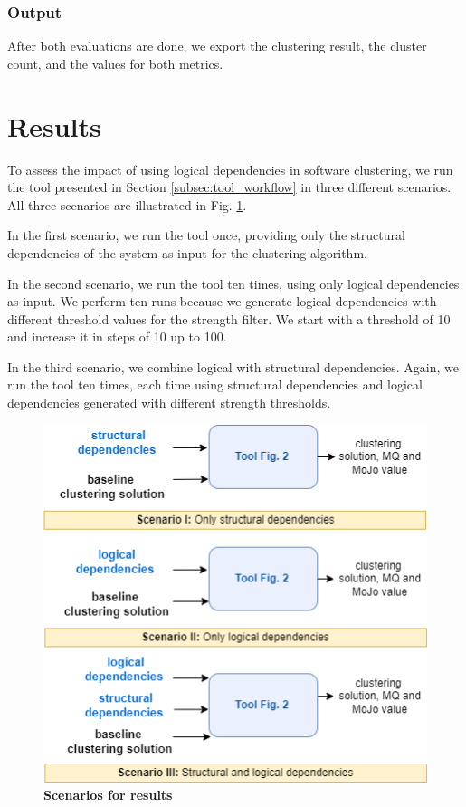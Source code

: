 \documentclass{ieeeaccess}
\begin{document}
\subsubsection{Output}

After both evaluations are done, we export the clustering result, the cluster count, and the values for both metrics.

\section{Results}
\label{sec:results}

To assess the impact of using logical dependencies in software clustering, we run the tool presented in Section \ref{subsec:tool_workflow} in three different scenarios. All three scenarios are illustrated in Fig. \ref{fig:scenatrio}.

In the first scenario, we run the tool once, providing only the structural dependencies of the system as input for the clustering algorithm.

In the second scenario, we run the tool ten times, using only logical dependencies as input. We perform ten runs because we generate logical dependencies with different threshold values for the strength filter. We start with a threshold of 10 and increase it in steps of 10 up to 100.

In the third scenario, we combine logical with structural dependencies. Again, we run the tool ten times, each time using structural dependencies and logical dependencies generated with different strength thresholds.

\begin{figure}[t!]
  \centering
  \includegraphics[width=\columnwidth]{scenario.png}
  \caption{ \textbf{Scenarios for results}}
  \label{fig:scenatrio}
\end{figure}
\end{document}
